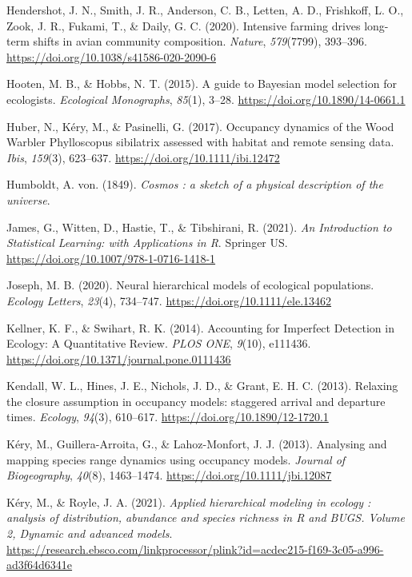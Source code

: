 \documentclass[
]{article}
\newlength{\cslhangindent}
\newenvironment{CSLReferences}[2] %
 {\begin{list}{}{%
  \setlength{\itemindent}{0pt}
  \setlength{\leftmargin}{0pt}
  \setlength{\parsep}{0pt}
  \ifodd #1
   \setlength{\leftmargin}{\cslhangindent}
   \setlength{\itemindent}{-1\cslhangindent}
  \fi
  \setlength{\itemsep}{#2\baselineskip}}}
 {\end{list}}
\begin{document}
\begin{CSLReferences}{1}{0}
Hendershot, J. N., Smith, J. R., Anderson, C. B., Letten, A. D.,
Frishkoff, L. O., Zook, J. R., Fukami, T., \& Daily, G. C. (2020).
Intensive farming drives long-term shifts in avian community
composition. \emph{Nature}, \emph{579}(7799), 393--396.
\url{https://doi.org/10.1038/s41586-020-2090-6}

Hooten, M. B., \& Hobbs, N. T. (2015). A guide to Bayesian model
selection for ecologists. \emph{Ecological Monographs}, \emph{85}(1),
3--28. \url{https://doi.org/10.1890/14-0661.1}

Huber, N., Kéry, M., \& Pasinelli, G. (2017). Occupancy dynamics of the
Wood Warbler Phylloscopus sibilatrix assessed with habitat and remote
sensing data. \emph{Ibis}, \emph{159}(3), 623--637.
\url{https://doi.org/10.1111/ibi.12472}

Humboldt, A. von. (1849). \emph{Cosmos : a sketch of a physical
description of the universe}.

James, G., Witten, D., Hastie, T., \& Tibshirani, R. (2021). \emph{An
Introduction to Statistical Learning: with Applications in R}. Springer
US. \url{https://doi.org/10.1007/978-1-0716-1418-1}

Joseph, M. B. (2020). Neural hierarchical models of ecological
populations. \emph{Ecology Letters}, \emph{23}(4), 734--747.
\url{https://doi.org/10.1111/ele.13462}

Kellner, K. F., \& Swihart, R. K. (2014). Accounting for Imperfect
Detection in Ecology: A Quantitative Review. \emph{PLOS ONE},
\emph{9}(10), e111436.
\url{https://doi.org/10.1371/journal.pone.0111436}

Kendall, W. L., Hines, J. E., Nichols, J. D., \& Grant, E. H. C. (2013).
Relaxing the closure assumption in occupancy models: staggered arrival
and departure times. \emph{Ecology}, \emph{94}(3), 610--617.
\url{https://doi.org/10.1890/12-1720.1}

Kéry, M., Guillera-Arroita, G., \& Lahoz-Monfort, J. J. (2013).
Analysing and mapping species range dynamics using occupancy models.
\emph{Journal of Biogeography}, \emph{40}(8), 1463--1474.
\url{https://doi.org/10.1111/jbi.12087}

Kéry, M., \& Royle, J. A. (2021). \emph{Applied hierarchical modeling in
ecology : analysis of distribution, abundance and species richness in R
and BUGS. Volume 2, Dynamic and advanced models}.
\url{https://research.ebsco.com/linkprocessor/plink?id=acdec215-f169-3c05-a996-ad3f64d6341e}


\end{CSLReferences}
\end{document}
